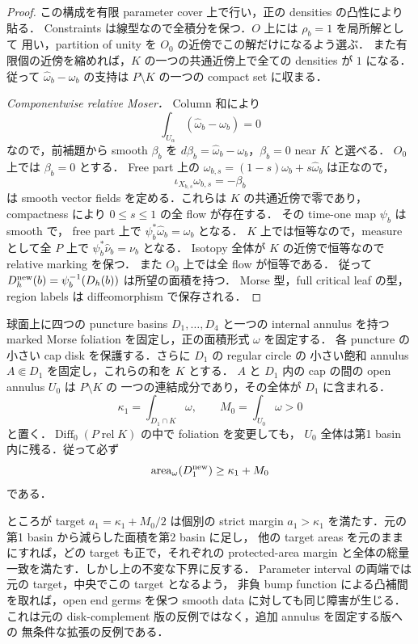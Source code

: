 \begin{proof}
この構成を有限 parameter cover 上で行い，正の densities の凸性により貼る．
Constraints は線型なので全積分を保つ．$O$ 上には $\rho_b=1$ を局所解として
用い，partition of unity を $O_0$ の近傍でこの解だけになるよう選ぶ．
また有限個の近傍を縮めれば，$K$ の一つの共通近傍上で全ての densities が
$1$ になる．従って $\widehat\omega_b-\omega_b$ の支持は
$P\setminus K$ の一つの compact set に収まる．

\emph{Componentwise relative Moser．}
Column 和により
\[
 \int_{U_\alpha}(\widehat\omega_b-\omega_b)=0
\]
なので，前補題から smooth $\beta_b$ を
$d\beta_b=\widehat\omega_b-\omega_b$，$\beta_b=0$ near $K$ と選べる．
$O_0$ 上では $\beta_b=0$ とする．
Free part 上の $\omega_{b,s}=(1-s)\omega_b+s\widehat\omega_b$ は正なので，
\[
 \iota_{X_{b,s}}\omega_{b,s}=-\beta_b
\]
は smooth vector fields を定める．これらは $K$ の共通近傍で零であり，
compactness により $0\le s\le1$ の全 flow が存在する．
その time-one map $\psi_b$ は smooth で，
free part 上で $\psi_b^*\widehat\omega_b=\omega_b$ となる．
$K$ 上では恒等なので，measure として全 $P$ 上で
$\psi_b^*\widehat\nu_b=\nu_b$ となる．
Isotopy 全体が $K$ の近傍で恒等なので relative marking を保つ．
また $O_0$ 上では全 flow が恒等である．
従って $D_h^{\rm new}(b)=\psi_b^{-1}(D_h(b))$ は所望の面積を持つ．
Morse 型，full critical leaf の型，region labels は diffeomorphism で保存される．
\end{proof}

\begin{example}
\label{ng8:annular-protection-obstruction}
球面上に四つの puncture basins $D_1,\ldots,D_4$ と一つの internal annulus を持つ
marked Morse foliation を固定し，正の面積形式 $\omega$ を固定する．
各 puncture の小さい cap disk を保護する．さらに $D_1$ の regular circle の
小さい飽和 annulus $A\Subset D_1$ を固定し，これらの和を $K$ とする．
$A$ と $D_1$ 内の cap の間の open annulus $U_0$ は $P\setminus K$ の
一つの連結成分であり，その全体が $D_1$ に含まれる．
\[
 \kappa_1=\int_{D_1\cap K}\omega,\qquad
 M_0=\int_{U_0}\omega>0
\]
と置く．$\operatorname{Diff}_0(P\operatorname{ rel}K)$ の中で foliation を変更しても，
$U_0$ 全体は第1 basin 内に残る．従って必ず
\[
 \operatorname{area}_{\omega}(D_1^{\rm new})\ge\kappa_1+M_0
\]
である．

ところが target $a_1=\kappa_1+M_0/2$ は個別の strict margin
$a_1>\kappa_1$ を満たす．元の第1 basin から減らした面積を第2 basin に足し，
他の target areas を元のままにすれば，どの target も正で，それぞれの
protected-area margin と全体の総量一致を満たす．しかし上の不変な下界に反する．
Parameter interval の両端では元の target，中央でこの target となるよう，
非負 bump function による凸補間を取れば，open end germs を保つ smooth data
に対しても同じ障害が生じる．
これは元の disk-complement 版の反例ではなく，追加 annulus を固定する版への
無条件な拡張の反例である．
\end{example}

